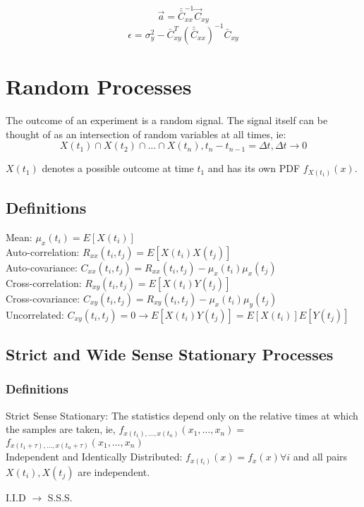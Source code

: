 \documentclass[8pt]{extarticle}
\begin{document}
\begin{multicols*}{3}
\begin{center}
\[ \vec{a} = \bar{\bar{C}}_{xx}^{-1}\vec{C}_{xy} \]
\[ \epsilon = \sigma_y^2 - \bar{C}_{xy}^{T} (\bar{\bar{C}}_{xx})^{-1} \bar{C}_{xy} \]

\section{Random Processes}
The outcome of an experiment is a random signal. The signal itself can be thought of as an intersection of random variables at all times, ie:
\[ X(t_1) \cap X(t_2) \cap \ldots \cap X(t_n), t_n - t_{n-1} = \Delta t, \Delta t \rightarrow 0 \]

\( X(t_1) \) denotes a possible outcome at time \( t_1 \) and has its own PDF \( f_{X(t_1)}(x) \).

\subsection{Definitions}
Mean: \( \mu_x(t_i) = E[X(t_i)] \) \\
Auto-correlation: \( R_{xx}(t_i, t_j) = E[X(t_i)X(t_j)] \) \\
Auto-covariance: \( C_{xx}(t_i, t_j) = R_{xx}(t_i, t_j) - \mu_x(t_i)\mu_x(t_j) \) \\
Cross-correlation: \( R_{xy}(t_i, t_j) = E[X(t_i)Y(t_j)] \) \\
Cross-covariance: \( C_{xy}(t_i, t_j) = R_{xy}(t_i, t_j)-\mu_x(t_i)\mu_y(t_j) \) \\
Uncorrelated: \( C_{xy}(t_i, t_j) = 0 \rightarrow E[X(t_i)Y(t_j)] = E[X(t_i)]E[Y(t_j)] \) \\

\subsection{Strict and Wide Sense Stationary Processes}
\subsubsection{Definitions}
Strict Sense Stationary: The statistics depend only on the relative times at which the samples are taken, ie,
\( f_{x(t_1),\ldots,x(t_n)}(x_1,\ldots,x_n) = \) \( f_{x(t_1+\tau),\ldots,x(t_n+\tau)}(x_1,\ldots,x_n) \) \\

Independent and Identically Distributed:
\( f_{x(t_i)}(x) = f_{x}(x) \forall i \) and all pairs \( X(t_i), X(t_j) \) are independent.

I.I.D \( \rightarrow \) S.S.S.


\end{center}
\end{multicols*}
\end{document}
